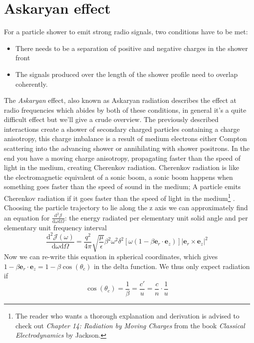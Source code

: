 \documentclass[11pt,a4paper,faculty=we,language=en,doctype=report]{cls/ugent-doc}
\begin{document}
\section{Askaryan effect}
For a particle shower to emit strong radio signals, two conditions have to be met:
\begin{itemize}
	\item There needs to be a separation of positive and negative charges in the shower front 
	\item The signals produced over the length of the shower profile need to overlap coherently.
\end{itemize}
The \textit{Askaryan} \cite{Askaryan} effect, also known as Askaryan radiation
describes the effect at radio frequencies which abides by both of these
conditions, in general it's a quite difficult effect but we'll give a crude
overview.  The previously described interactions create a shower of secondary
charged particles containing a charge anisotropy, this charge imbalance is a
result of medium electrons either Compton scattering into the advancing shower
or annihilating with shower positrons.  In the end you have a moving charge
anisotropy, propagating faster than the speed of light in the medium, creating
Cherenkov radiation.  Cherenkov radiation is like the electromagnetic
equivalent of a sonic boom, a sonic boom happens when something goes faster
than the speed of sound in the medium; A particle emits Cherenkov radiation if it
goes faster than the speed of light in the medium\footnote{The reader who wants a
	thorough explanation and derivation is advised to check out
\textit{Chapter 14: Radiation by Moving Charges} from the book
\textit{Classical Electrodynamics} by Jackson.} . Choosing the particle
trajectory to lie along the z axis we can approximately find an equation for
$\frac{\text{d}^2 \mathscr{J}}{\text{d}\omega \text{d}\Omega}$: the energy
radiated per elementary unit solid angle and per elementary unit frequency
interval
\begin{equation}
	\frac{\text{d}^2 \mathscr{J}(\omega)}{\text{d} \omega \text{d} \Omega} = \frac{q^2}{4\pi}\sqrt{\frac{\mu}{\epsilon}}\beta^2\omega^2\delta^2[\omega(1-\beta \mathbf{e}_r\cdot\mathbf{e}_z)]|\mathbf{e}_r\times\mathbf{e}_z|^2 \label{equation: 4.128 in elektromagnetisme}
\end{equation}
Now we can re-write this equation in spherical coordinates, which gives $1-\beta \mathbf{e}_r\cdot\mathbf{e}_z = 1-\beta\cos(\theta_c)$ in the delta function. We thus only expect radiation if
\begin{equation}
\cos(\theta_c) = \frac{1}{\beta} = \frac{c'}{u} = \frac{c}{n}\cdot\frac{1}{u}
\end{equation}
\end{document}
